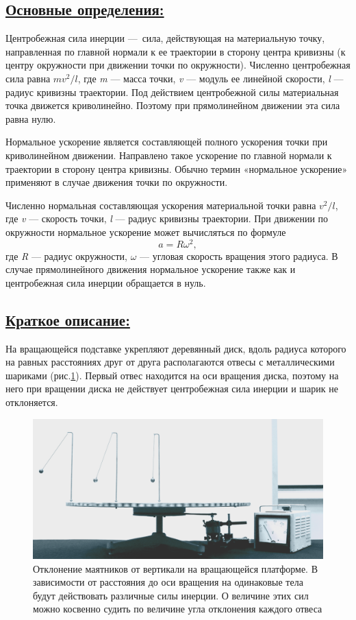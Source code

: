 \documentclass[14pt,a4paper,oneside]{extarticle}	%
\begin{document}
	\newpage
	\subsection*{\underline{Основные определения:}}
		
		Центробежная сила инерции — сила, действующая на материальную точку, 
		направленная по главной нормали к ее траектории в сторону центра кривизны 
		(к центру окружности при движении точки по окружности).
		Численно центробежная сила равна $ mv^2/l $, где \textit{m} — масса точки, \textit{v} — модуль ее линейной скорости, \textit{l} — радиус кривизны траектории.
		Под действием центробежной силы материальная точка движется криволинейно. 
		Поэтому при прямолинейном движении эта сила равна нулю.
		
		Нормальное ускорение является составляющей полного ускорения точки при криволинейном движении.
		Направлено такое ускорение по главной нормали к траектории в сторону центра кривизны.
		Обычно термин «нормальное ускорение» применяют в случае движения точки по окружности.
		
		Численно нормальная составляющая ускорения материальной точки равна $ v^2/l $, где \textit{v} — скорость точки, \textit{l} — радиус кривизны траектории.
		При движении по окружности нормальное ускорение может вычисляться по формуле $$ a = R\omega^2, $$ где \textit{R} — радиус окружности, $ \omega $ — угловая скорость вращения этого радиуса. 
		В случае прямолинейного движения нормальное ускорение также как и центробежная сила инерции обращается в нуль.

	\newpage
\subsection*{\underline{Краткое описание:}}
			
На вращающейся подставке укрепляют деревянный диск, вдоль радиуса которого на равных расстояниях друг от друга располагаются отвесы с металлическими шариками (рис.\ref{platform-2}).
Первый отвес находится на оси вращения диска, поэтому на него при вращении диска не действует центробежная сила инерции и шарик не отклоняется.
\begin{figure}[H] 
\centering 		
\includegraphics[width=0.9\linewidth]{platform-2.png} 
\caption{Отклонение маятников от вертикали на вращающейся платформе. В зависимости от расстояния до оси вращения на одинаковые тела будут действовать различные силы инерции. О величине этих сил можно косвенно судить по величине угла отклонения каждого отвеса}
\label{platform-2}
\end{figure}
	
\end{document}
